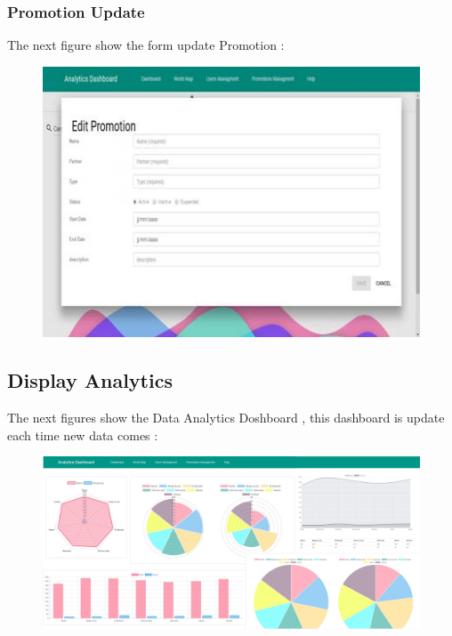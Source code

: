 \subsubsection{Promotion Update}
\label{sec:sec01}
The next figure show the form update Promotion :
\begin{figure}[h!]
	\centering
	\includegraphics[height=0.3\textheight]{fig01/PromotionUpdate}
	\label{fig:FilialesEtClients}
\end{figure}
\subsection{Display Analytics}
\label{sec:sec01}
The next figures show the Data Analytics Doshboard , this dashboard is update each time new data comes :
\begin{figure}[h!]
	\centering
	\includegraphics[height=0.3\textheight]{fig01/Dashboard}
	\label{fig:FilialesEtClients}
\end{figure}
